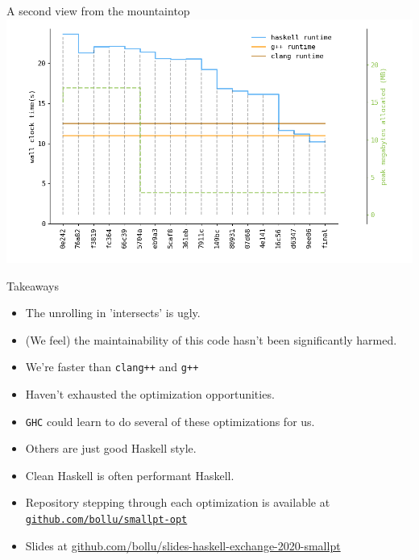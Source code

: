 \documentclass[8pt]{beamer}
\begin{document}
\begin{frame}[fragile]{A second view from the mountaintop}
\includegraphics[height=0.6\textwidth]{perfdata-upto-9ee06-gen.png}
\end{frame}


\begin{frame}[fragile]{Takeaways}
\begin{itemize}
\item The unrolling in 'intersects' is ugly.
\item (We feel) the maintainability of this code hasn’t been significantly harmed.
\item We're faster than \texttt{clang++} and \texttt{g++}
\item Haven't exhausted the optimization opportunities.
\item \texttt{GHC} could learn to do several of these optimizations for us.
\item Others are just good Haskell style. 
\item Clean Haskell is often performant Haskell.
\item Repository stepping through each optimization is available at \href{https://github.com/bollu/smallpt-opt}{\texttt{github.com/bollu/smallpt-opt}}
\item Slides at \href{https://github.com/bollu/slides-haskell-exchange-2020-smallpt}{github.com/bollu/slides-haskell-exchange-2020-smallpt}
\end{itemize}

\end{frame}
\end{document}
